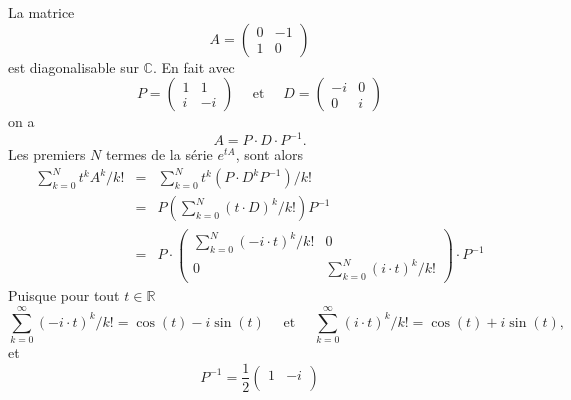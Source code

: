 \begin{example} 
  La matrice
  \begin{displaymath}
    A =
    \begin{pmatrix}
      0 & -1 \\
      1 & 0
    \end{pmatrix} 
  \end{displaymath}
  est diagonalisable sur $ℂ$.  En fait avec
  \begin{displaymath}
    P =  \left(\begin{array}{rr}
                 1 & 1 \\
                  i & - i
               \end{array}\right) \quad \text{ et }  \quad
             D = \left(\begin{array}{rr}
                         - i & 0 \\
                         0 &  i
                       \end{array}\right)
  \end{displaymath}
  on a 
  \begin{displaymath}
    A =
    P ⋅ D ⋅ P^{-1}.      
  \end{displaymath}
  Les premiers $N$ termes de la série $e^{tA}$, sont  alors
  \begin{eqnarray*}
    ∑_{k=0}^N t^k A^k / k!  & = & ∑_{k=0}^N t^k \left(P ⋅ D^k P^{-1}\right)/ k!   \\
                       & = & P  \left( ∑_{k=0}^N (t⋅ D)^k/ k!  \right)P^{-1}  \\
                       & =  & P ⋅
                            \begin{pmatrix}
                              \displaystyle ∑_{k=0}^N (-i ⋅t)^k/ k!   & 0 \\
                              0 &  \displaystyle ∑_{k=0}^N (i ⋅t)^k / k! 
                            \end{pmatrix} ⋅P^{-1}
  \end{eqnarray*}
  Puisque pour tout $t ∈ ℝ$ 
  \begin{displaymath}
    ∑_{k=0}^∞ (- i ⋅ t )^k/ k!  =  \cos(t) - i \sin(t)  \quad  \text{ et } \quad  ∑_{k=0}^∞ ( i ⋅ t )^k  / k! =   \cos(t) + i \sin(t),
  \end{displaymath}
et 
  \begin{displaymath}
    P^{-1}  = \frac{1}{2}
    \begin{pmatrix}
      1 & - i \\

\end{pmatrix}
\end{displaymath}
\end{example}

